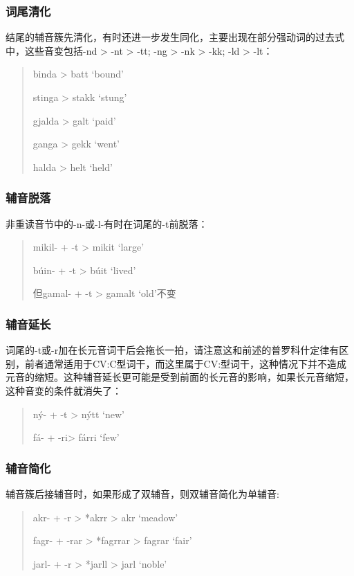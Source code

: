 \subsubsection{词尾清化}
\label{词尾清化}

结尾的辅音簇先清化，有时还进一步发生同化，主要出现在部分强动词的过去式中，这些音变包括-nd
> -nt > -tt; -ng > -nk
> -kk; -ld > -lt：

\begin{quote}
  binda > batt `bound'

  stinga > stakk `stung'

  gjalda > galt `paid'

  ganga > gekk `went'

  halda > helt `held'
\end{quote}

\subsubsection{辅音脱落}
\label{辅音脱落}

非重读音节中的-n-或-l-有时在词尾的-t前脱落：

\begin{quote}
  mikil- + -t > mikit `large'

  búin- + -t > búit `lived'

  但gamal- + -t > gamalt `old'不变
\end{quote}

\subsubsection{辅音延长}
\label{辅音延长}

词尾的-t或-r加在长元音词干后会拖长一拍，请注意这和前述的普罗科什定律有区别，前者通常适用于CV:C型词干，而这里属于CV:型词干，这种情况下并不造成元音的缩短。这种辅音延长更可能是受到前面的长元音的影响，如果长元音缩短，这种音变的条件就消失了：

\begin{quote}
  ný- + -t > nýtt `new'

  fá- + -ri> fárri `few'
\end{quote}

\subsubsection{辅音简化}
\label{辅音简化}
辅音簇后接辅音时，如果形成了双辅音，则双辅音简化为单辅音:

\begin{quote}
  akr- + -r > *akrr > akr `meadow'

  fagr- + -rar > *fagrrar > fagrar `fair'

  jarl- + -r > *jarll > jarl `noble'
\end{quote}


